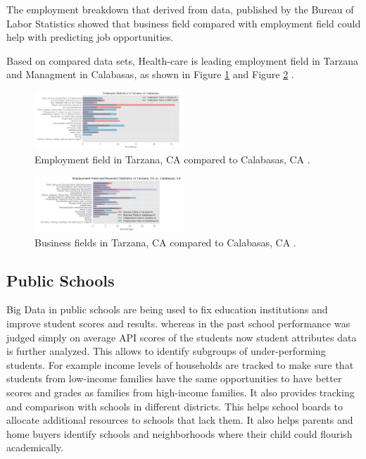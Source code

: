 \documentclass[sigconf]{acmart}
\begin{document}
The employment breakdown that derived from data, published by the Bureau of Labor Statistics showed that business field compared with employment field could help with predicting job opportunities.

Based on compared data sets, Health-care is leading employment field in Tarzana and Managment in Calabasas, as shown in Figure \ref{fig:figure8} and Figure \ref{fig:figure9} \cite{md}.

\begin{figure}
  \centering
  \includegraphics[width=0.5\textwidth]{images/figure8.png}
  \caption{Employment field in Tarzana, CA compared to Calabasas, CA \cite{md}.} \label{fig:figure8} 
\end{figure}

\begin{figure}
  \centering
  \includegraphics[width=0.5\textwidth]{images/figure9.png}
  \caption{Business fields in Tarzana, CA compared to Calabasas, CA \cite{md}.} \label{fig:figure9} 
\end{figure}

\subsection{Public Schools}

Big Data in public schools are being used to fix education institutions and improve student scores and results. whereas in the past school performance was judged simply on average API scores of the students now student attributes data is further analyzed.  This allows to identify subgroups of under-performing students.  For example income levels of households are tracked to make sure that students from low-income families have the same opportunities to have better scores and grades as families from high-income families. It also provides tracking and comparison with schools in different districts. This helps school boards to allocate additional resources to schools that lack them.  It also helps parents and home buyers identify schools and neighborhoods where their child could flourish academically.   
\end{document}
